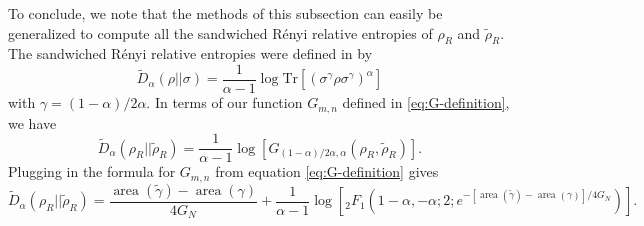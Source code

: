 \documentclass[a4paper,11pt]{article}
\renewcommand{\tr}{\text{Tr}}
\renewcommand{\tilde}{\widetilde}
\newcommand{\area}{\operatorname{area}}
\begin{document}
To conclude, we note that the methods of this subsection can easily be generalized to compute all the sandwiched R\'{e}nyi relative entropies of $\rho_{R}$ and $\tilde{\rho}_{R}$. The sandwiched R\'{e}nyi relative entropies were defined in \cite{muller-lennert_quantum_2013, wilde_strong_2014} by
\begin{equation}
    \tilde{D}_{\alpha}(\rho || \sigma) = \frac{1}{\alpha - 1} \log \tr[(\sigma^\gamma \rho \sigma^\gamma)^\alpha]
\end{equation}
with $\gamma = (1-\alpha)/2 \alpha.$ In terms of our function $G_{m, n}$ defined in \eqref{eq:G-definition}, we have
\begin{equation}
    \tilde{D}_{\alpha}(\rho_R || \tilde{\rho}_{R})
        = \frac{1}{\alpha - 1} \log\left[ G_{(1 - \alpha)/2 \alpha, \alpha}(\rho_R, \tilde{\rho}_{R})  \right].
\end{equation}
Plugging in the formula for $G_{m,n}$ from equation \eqref{eq:G-definition} gives
\begin{equation} \label{eq:sandwiched-Renyis}
    \tilde{D}_{\alpha}(\rho_R || \tilde{\rho}_{R})
        = \frac{\area(\tilde{\gamma}) - \area(\gamma)}{4 G_N} + \frac{1}{\alpha - 1} \log\left[ {}_2 F_1 \left(1-\alpha, -\alpha; 2; e^{- [\area(\tilde{\gamma}) - \area(\gamma)]/ 4 G_N} \right)  \right].
\end{equation}
\end{document}
